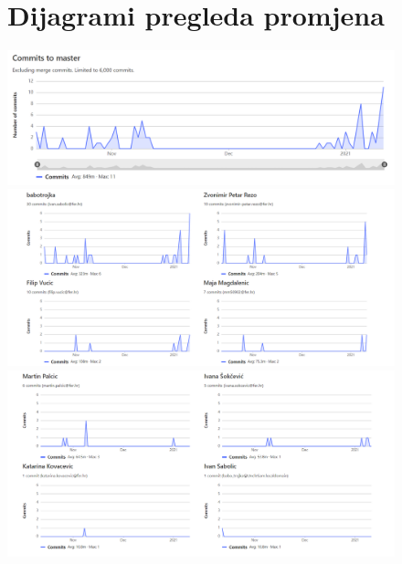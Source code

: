 \begin{figure}
	\section{Dijagrami pregleda promjena}
	\includegraphics[scale=0.55]{slike/commitMaster.PNG}
	\newline\includegraphics[scale=0.61]{slike/commitOsobe1.PNG}
	\newline
	\newline\includegraphics[scale=0.61]{slike/commitOsobe2.PNG}
\end{figure}
